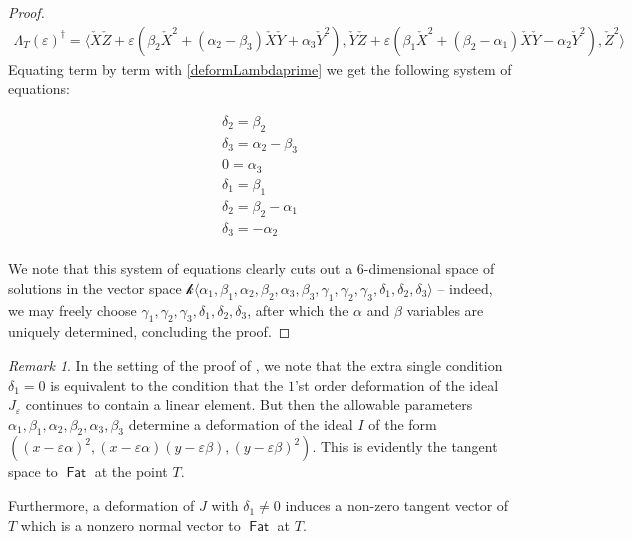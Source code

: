 \documentclass[reqno, 11pt]{amsart}
\theoremstyle{plain}
\theoremstyle{remark}
\newtheorem{remark}[theorem]{Remark}
\renewcommand{\k}{\mathscr{k}}
\DeclareMathOperator{\Fat}{\mathsf{Fat}}
\begin{document}
\begin{proof}
\begin{eqnarray*}
    \Lambda_{T}(\varepsilon)^{\dagger} = \langle \check{X}\check{Z} + \varepsilon(\beta_{2}\check{X}^{2} + (\alpha_{2}-\beta_{3})\check{X}\check{Y} + \alpha_{3}\check{Y}^{2}), \check{Y}\check{Z} + \varepsilon(\beta_{1}\check{X}^{2}+(\beta_{2}-\alpha_{1})\check{X}\check{Y} - \alpha_{2}\check{Y}^{2}), \check{Z}^{2} \rangle
\end{eqnarray*}
Equating term by term with \eqref{deformLambdaprime} we get the following system of equations:


\begin{eqnarray*}\label{SystemOfEquations}
  \delta_{2} =\beta_{2}\\
  \delta_{3} = \alpha_{2}-\beta_{3}\\
  0 = \alpha_{3}\\
  \delta_{1} = \beta_{1}\\
   \delta_{2} = \beta_{2}-\alpha_{1}\\
  \delta_{3} = -\alpha_{2}\\
\end{eqnarray*}

We note that this system of equations clearly cuts out a
$6$-dimensional space of solutions in the vector space
$\k\langle \alpha_{1}, \beta_{1}, \alpha_{2}, \beta_{2}, \alpha_{3},
\beta_{3}, \gamma_{1}, \gamma_{2}, \gamma_{3}, \delta_{1}, \delta_{2},
\delta_{3} \rangle$ -- indeed, we may freely choose
$\gamma_{1}, \gamma_{2}, \gamma_{3}, \delta_{1}, \delta_{2},
\delta_{3} $, after which the $\alpha$ and $\beta$ variables are
uniquely determined, concluding the proof.
\end{proof}


\begin{remark}
\label{remark:delta1transversality} In the setting of the proof of , we note that the extra single condition $\delta_{1} = 0$ is equivalent to the condition that the $1$'st order deformation of the ideal $J_{\varepsilon}$ continues to contain a linear element.  But then the allowable parameters $\alpha_{1}, \beta_{1}, \alpha_{2}, \beta_{2}, \alpha_{3}, \beta_{3}$ determine a deformation of the ideal $I$ of the form $((x-\varepsilon \alpha)^{2}, (x - \varepsilon \alpha)(y - \varepsilon \beta), (y - \varepsilon \beta)^{2})$.  This is evidently the tangent space to $\Fat$ at the point $T$.

Furthermore, a deformation of $J$ with $\delta_{1} \neq 0$ induces a non-zero tangent vector of $T$ which is a nonzero normal vector to $\Fat$ at $T$.
\end{remark} 
\end{document}
